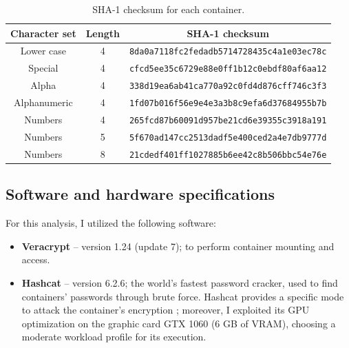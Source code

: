 \documentclass[12pt]{article}
\begin{document}
\begin{table}[!ht]
    \centering
    \begin{tabular}{ccc}
    \toprule
        \textbf{Character set} & \textbf{Length} & \textbf{SHA-1 checksum} \\ 
        \midrule
        Lower case & 4 & \texttt{8da0a7118fc2fedadb5714728435c4a1e03ec78c} \\ 
        Special & 4 & \texttt{cfcd5ee35c6729e88e0ff1b12c0ebdf80af6aa12} \\ 
        Alpha & 4 & \texttt{338d19ea6ab41ca770a92c0fd4d876cff746c3f3} \\ 
        Alphanumeric & 4 & \texttt{1fd07b016f56e9e4e3a3b8c9efa6d37684955b7b} \\ 
        Numbers & 4 & \texttt{265fcd87b60091d957be21cd6e39355c3918a191} \\ 
        Numbers & 5 & \texttt{5f670ad147cc2513dadf5e400ced2a4e7db9777d} \\ 
        Numbers & 8 & \texttt{21cdedf401ff1027885b6ee42c8b506bbc54e76e} \\ 
    \bottomrule
    \end{tabular}
    \caption{SHA-1 checksum for each container.}
    \label{table:sha1}
\end{table}

\subsection{Software and hardware specifications}
\label{sec:specs}

For this analysis, I utilized the following software:

\begin{itemize}
    \item \textbf{Veracrypt} \cite{veracrypt} -- version 1.24 (update 7); to perform container mounting and access.
    \item \textbf{Hashcat} \cite{hashcat} -- version 6.2.6; the world's fastest password cracker, used to find containers' passwords through brute force. Hashcat provides a specific mode to attack the container's encryption \cite{hc-modes}; moreover, I exploited its GPU optimization on the graphic card GTX 1060 (6 GB of VRAM), choosing a moderate workload profile for its execution. 
\end{itemize}
\end{document}
